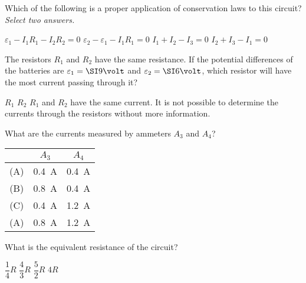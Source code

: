 \documentclass{../../oss-apphys-exam}
\begin{document}
\begin{questions}
  
  \question Which of the following is a proper application of conservation laws
  to this circuit? \emph{Select two answers.}
  \label{batt1}
  \begin{choices}
    \choice $\varepsilon_1 - I_1 R_1 - I_2 R_2 = 0$
    \choice $\varepsilon_2 - \varepsilon_1 - I_1 R_1 = 0$
    \choice $I_1 + I_2 - I_3 = 0$
    \choice $I_2 + I_3 - I_1 = 0$
  \end{choices}

  \question The resistors $R_1$ and $R_2$ have the same resistance. If the
  potential differences of the batteries are $\varepsilon_1=\SI9\volt$ and
  $\varepsilon_2=\SI6\volt$, which resistor will have the most current passing
  through it?
  \label{batt2}
  \begin{choices}
    \choice $R_1$
    \choice $R_2$
    \choice $R_1$ and $R_2$ have the same current.
    \choice It is not possible to determine the currents through the resistors
    without more information.
  \end{choices}


  \question What are the currents measured by ammeters $A_3$ and $A_4$?
  \label{identical1}
  
  \begin{tabular}{ccc}
    & $A_3$ & $A_4$ \\ \hline
    (A) & \SI{.4}\ampere & \SI{.4}\ampere \\
    (B) & \SI{.8}\ampere & \SI{.4}\ampere \\
    (C) & \SI{.4}\ampere & \SI{1.2}\ampere \\
    (A) & \SI{.8}\ampere & \SI{1.2}\ampere
  \end{tabular}

  \question What is the equivalent resistance of the circuit?
  \label{identical2}
  \begin{choices}
    \choice $\dfrac14R$
    \choice $\dfrac43R$
    \choice $\dfrac52R$
    \choice $4R$
  \end{choices}


\end{questions}
\end{document}
